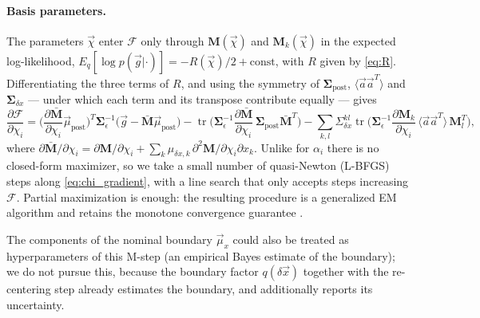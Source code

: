 \documentclass{article}
\begin{document}
\paragraph{Basis parameters.} The parameters $\vec\chi$ enter $\mathcal F$ only through $\mathbf M(\vec\chi)$ and $\mathbf M_k(\vec\chi)$ in the expected log-likelihood, $E_q[\log p(\vec g|\cdot)] = -R(\vec\chi)/2 + \text{const}$, with $R$ given by \eqref{eq:R}. Differentiating the three terms of $R$, and using the symmetry of $\mathbf{\Sigma}_{\text{post}}$, $\langle\vec a\vec a^T\rangle$ and $\mathbf{\Sigma}_{\delta x}$ --- under which each term and its transpose contribute equally --- gives
\begin{equation}
    \frac{\partial \mathcal F}{\partial \chi_i} =
    \Big(\frac{\partial \bar{\mathbf M}}{\partial \chi_i}\vec\mu_{\text{post}}\Big)^T \mathbf{\Sigma}_\epsilon^{-1}\big(\vec g - \bar{\mathbf M}\vec\mu_{\text{post}}\big)
    - \operatorname{tr}\Big(\mathbf{\Sigma}_\epsilon^{-1}\frac{\partial \bar{\mathbf M}}{\partial \chi_i}\,\mathbf{\Sigma}_{\text{post}}\bar{\mathbf M}^T\Big)
    - \sum_{k,l}\Sigma_{\delta x}^{kl}\operatorname{tr}\Big(\mathbf{\Sigma}_\epsilon^{-1}\frac{\partial \mathbf M_k}{\partial \chi_i}\,\langle\vec a\vec a^T\rangle\,\mathbf M_l^T\Big), \label{eq:chi_gradient}
\end{equation}
where $\partial\bar{\mathbf M}/\partial\chi_i = \partial\mathbf M/\partial\chi_i + \sum_k \mu_{\delta x,k}\,\partial^2\mathbf M/\partial\chi_i\partial x_k$. Unlike for $\alpha_i$ there is no closed-form maximizer, so we take a small number of quasi-Newton (L-BFGS) steps along \eqref{eq:chi_gradient}, with a line search that only accepts steps increasing $\mathcal F$. Partial maximization is enough: the resulting procedure is a generalized EM algorithm and retains the monotone convergence guarantee \cite{bishop2006pattern}.

The components of the nominal boundary $\vec\mu_x$ could also be treated as hyperparameters of this M-step (an empirical Bayes estimate of the boundary); we do not pursue this, because the boundary factor $q(\delta\vec x)$ together with the re-centering step already estimates the boundary, and additionally reports its uncertainty.
\end{document}
